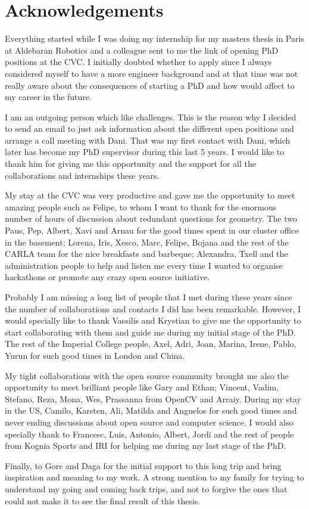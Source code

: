 \setlength{\parindent}{15pt}
\setlength{\parskip}{0em}

\chapter*{Acknowledgements}
\vspace{-15mm}

Everything started while I was doing my internship for my masters thesis in Paris at Aldebaran Robotics and a colleague sent to me the link of opening PhD positions at the CVC. I initially doubted whether to apply since I always considered myself to have a more engineer background and at that time was not really aware about the consequences of starting a PhD and how would affect to my career in the future.

I am an outgoing person which like challenges. This is the reason why I decided to send an email to just ask information about the different open positions and arrange a call meeting with Dani. That was my first contact with Dani, which later has become my PhD supervisor during this last 5 years. I would like to thank him for giving me this opportunity and the support for all the collaborations and internships these years.

My stay at the CVC was very productive and gave me the opportunity to meet amazing people such as Felipe, to whom I want to thank for the enormous number of hours of discussion about redundant questions for geometry. The two Paus, Pep, Albert, Xavi and Arnau for the good times spent in our cluster office in the basement; Lorena, Iris, Xesco, Marc, Felipe, Bojana and the rest of the CARLA team for the nice breakfasts and barbeque; Alexandra, Txell and the administration people to help and listen me every time I wanted to organise hackathons or promote any crazy open source initiative.

Probably I am missing a long list of people that I met during these years since the number of collaborations and contacts I did has been remarkable. However, I would specially like to thank Vassilis and Krystian to give me the opportunity to start collaborating with them and guide me during my initial stage of the PhD. The rest of the Imperial College people, Axel, Adri, Joan, Marina, Irene, Pablo, Yurun for such good times in London and China.

My tight collaborations with the open source community brought me also the opportunity to meet brilliant people like Gary and Ethan; Vincent, Vadim, Stefano, Reza, Mona, Wes, Prassanna from OpenCV and Arraiy. During my stay in the US, Camilo, Karsten, Ali, Matilda and Anguelos for such good times and never ending discussions about open source and computer science. I would also specially thank to Francesc, Luis, Antonio, Albert, Jordi and the rest of people from Kognia Sports and IRI for helping me during my last stage of the PhD.

Finally, to Gore and Daga for the initial support to this long trip and bring inspiration and meaning to my work. A strong mention to my family for trying to understand my going and coming back trips, and not to forgive the ones that could not make it to see the final result of this thesis. 

\setlength{\parskip}{1em}
